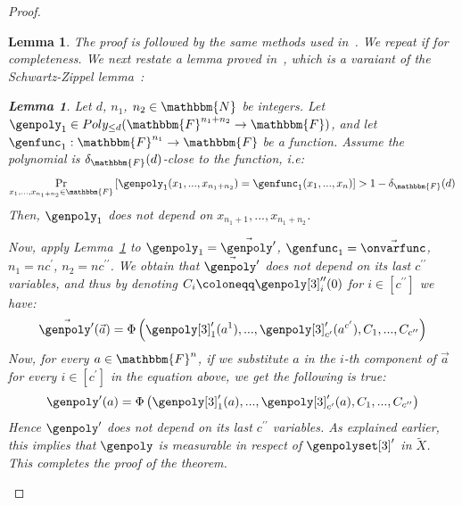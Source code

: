 \documentclass[10pt,a4paper]{article}
\newtheorem{lemma}[theorem]{Lemma}
\newcommand{\definedas}[0]{\coloneqq}
\newcommand{\parens}[1]{\left( #1 \right)}
\newcommand{\sparens}[1]{\left[ #1 \right]}
\newcommand{\basefield}[0]{\mathbbm{F}}
\newcommand{\blocklength}[0]{n}
\newcommand{\field}[0]{\basefield^{\blocklength}}
\newcommand{\degree}[0]{d}
\newcommand{\funcdef}[3]{#1:#2\rightarrow#3}
\newcommand{\allpolyset}[3]{Poly_{#1}(#2\rightarrow#3)}
\newcommand{\naturalnumbersset}[0]{\mathbbm{N}}
\newcommand{\variety}{{\tilde{X}}}
\newcommand{\prex}[2]{\Pr_{#1}\left[ #2 \right]}
\newcommand{\normalizedcodedistance}[2]{\delta_{#1}(#2)}
\begin{document}
\begin{proof}
\begin{lemma}
        The proof is followed by the same methods used in~\cite{bhowmick2014list}.
        We repeat if for completeness.
        We next restate a lemma proved in~\cite[Claim 4.2]{bhowmick2014list}, which is a varaiant of the Schwartz-Zippel lemma~\cite{10.1145/322217.322225,Zippel1979ProbabilisticAF}:
        \begin{lemma}\label{lemma-schwarz-zippel-for-comparing-polynomial-to-function-with-less-variables}
            Let $\degree$, $\blocklength_1$, $\blocklength_2 \in \naturalnumbersset$ be integers.
            Let $\genpoly_1 \in \allpolyset{\leq \degree}{\basefield^{\blocklength_1 + \blocklength_2}}{\basefield}$,
            and let $\funcdef{\genfunc_1}{\basefield^{\blocklength_1}}{\basefield}$ be a function.
            Assume the polynomial is $\normalizedcodedistance{\basefield}{\degree}$-close to the function, i.e:
            \[
                \prex{x_1,...,x_{\blocklength_1+\blocklength_2} \in \basefield}
                        {\genpoly_1(x_1,...,x_{\blocklength_1+\blocklength_2}) = \genfunc_1(x_1,...,x_n)} > 1 - \normalizedcodedistance{\basefield}{\degree}
            \]
            Then, $\genpoly_1$ does not depend on $x_{\blocklength_1 + 1},...,x_{\blocklength_1 + \blocklength_2}$.
        \end{lemma}
        Now, apply Lemma~\ref{lemma-schwarz-zippel-for-comparing-polynomial-to-function-with-less-variables} to
        $\genpoly_1 = \vec{\genpoly^{\prime}}$, $\genfunc_1 = \vec{\onvarfunc}$, $\blocklength_1 = \blocklength c^\prime$, $\blocklength_2 = \blocklength c^{\prime\prime}$.
        We obtain that $\vec{\genpoly^{\prime}}$ does not depend on its last $c^{\prime\prime}$ variables, and thus by denoting $C_{i} \definedas \genpoly[3]^{\prime\prime}_i(0)$ for $i \in \sparens{c^{\prime\prime}}$ we have:
        \[
            \vec{\genpoly^{\prime}}(\vec{a}) = \Phi \parens{\genpoly[3]^\prime_1(a^1),...,\genpoly[3]^\prime_{c^\prime}(a^{c^\prime}), C_1,...,C_{c^{\prime\prime}}}
        \]
        Now, for every $a \in \field$, if we substitute $a$ in the $i$-th component of $\vec{a}$ for every $i \in \sparens{c^{\prime}}$ in the equation above, we get the following is true:
        \[
            \genpoly^{\prime}(a) = \Phi \parens{\genpoly[3]^\prime_1(a),...,\genpoly[3]^\prime_{c^\prime}(a), C_1,...,C_{c^{\prime\prime}}}
        \]
        Hence $\genpoly^{\prime}$ does not depend on its last $c^{\prime\prime}$ variables.
        As explained earlier, this implies that $\genpoly$ is measurable in respect of $\genpolyset[3]^{\prime}$ in $\variety$.
        This completes the proof of the theorem.
    \end{lemma}

\end{proof}
\end{document}
